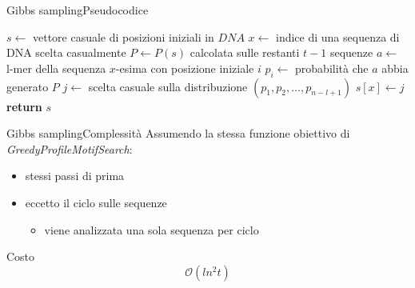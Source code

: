 	\begin{frame}{Gibbs sampling}{Pseudocodice}
		\begin{center}
			\begin{minipage}{11.5cm}
			    \begin{algorithmic}[1]
				    	\State $s\gets$  vettore casuale di posizioni iniziali in $DNA$
				    	\Repeat
				    		\State $x\gets$ indice di una sequenza di DNA scelta casualmente
				    		\State $P\gets P(s)$ calcolata sulle restanti $t-1$ sequenze
				    			\State $a\gets$ l-mer della sequenza $x$-esima con posizione iniziale $i$
				    			\State $p_i\gets $ probabilità che $a$ abbia generato $P$
				    		\EndFor
				    		\State $j\gets$ scelta casuale sulla distribuzione $(p_1,p_2,\dots,p_{n-l+1})$
				    		\State $s[x]\gets j$
				    	\State \textbf{return} $s$
				    \EndProcedure
			    \end{algorithmic}
			\end{minipage}
	    \end{center}
	\end{frame}
	
	\begin{frame}{Gibbs sampling}{Complessità}
		Assumendo la stessa funzione obiettivo di \textit{GreedyProfileMotifSearch}:
		\begin{itemize}
			\item stessi passi di prima
			\item eccetto il ciclo sulle sequenze
			\begin{itemize}
				\item viene analizzata una sola sequenza per ciclo
			\end{itemize}
		\end{itemize}
		\begin{center}
			\begin{minipage}{3cm}
				\begin{varblock}{Costo}
					$$\mathcal{O}(ln^2t)$$
				\end{varblock}
			\end{minipage}
		\end{center}
	\end{frame}
	
